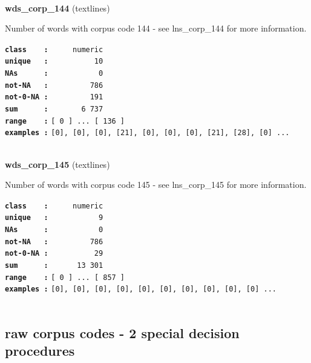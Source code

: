 \documentclass[]{article}
\begin{document}
~

\textbf{wds\_corp\_144} (textlines)

Number of words with corpus code 144 - see lns\_corp\_144 for more
information.

\textbf{\texttt{class\ \ \ \ :}} \texttt{~~~~~numeric}\\
\textbf{\texttt{unique\ \ \ :}} \texttt{~~~~~~~~~~10}\\
\textbf{\texttt{NAs\ \ \ \ \ \ :}} \texttt{~~~~~~~~~~~0}\\
\textbf{\texttt{not-NA\ \ \ :}} \texttt{~~~~~~~~~786}\\
\textbf{\texttt{not-0-NA\ :}} \texttt{~~~~~~~~~191}\\
\textbf{\texttt{sum\ \ \ \ \ \ :}} \texttt{~~~~~~~6~737}\\
\textbf{\texttt{range\ \ \ \ :}}
\texttt{{[}\ 0\ {]}\ ...\ {[}\ 136\ {]}}\\
\textbf{\texttt{examples\ :}}
\texttt{{[}0{]},\ {[}0{]},\ {[}0{]},\ {[}21{]},\ {[}0{]},\ {[}0{]},\ {[}0{]},\ {[}21{]},\ {[}28{]},\ {[}0{]}\ ...}\\

~

\textbf{wds\_corp\_145} (textlines)

Number of words with corpus code 145 - see lns\_corp\_145 for more
information.

\textbf{\texttt{class\ \ \ \ :}} \texttt{~~~~~numeric}\\
\textbf{\texttt{unique\ \ \ :}} \texttt{~~~~~~~~~~~9}\\
\textbf{\texttt{NAs\ \ \ \ \ \ :}} \texttt{~~~~~~~~~~~0}\\
\textbf{\texttt{not-NA\ \ \ :}} \texttt{~~~~~~~~~786}\\
\textbf{\texttt{not-0-NA\ :}} \texttt{~~~~~~~~~~29}\\
\textbf{\texttt{sum\ \ \ \ \ \ :}} \texttt{~~~~~~13~301}\\
\textbf{\texttt{range\ \ \ \ :}}
\texttt{{[}\ 0\ {]}\ ...\ {[}\ 857\ {]}}\\
\textbf{\texttt{examples\ :}}
\texttt{{[}0{]},\ {[}0{]},\ {[}0{]},\ {[}0{]},\ {[}0{]},\ {[}0{]},\ {[}0{]},\ {[}0{]},\ {[}0{]},\ {[}0{]}\ ...}\\

~

\subsection{raw corpus codes - 2 special decision
procedures}\label{raw-corpus-codes---2-special-decision-procedures}
\end{document}
